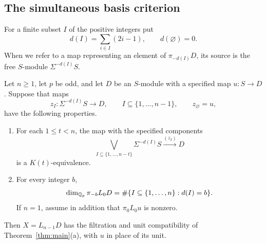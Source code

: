 \subsection{The simultaneous basis criterion}

For a finite subset \(I\) of the positive integers put
\[
d(I)=\sum_{i\in I}(2i-1),\qquad d(\varnothing)=0.
\]
When we refer to a map representing an element of
\(\pi_{-d(I)}D\), its source is the free \(S\)-module
\(\Sigma^{-d(I)}S\).

\begin{proposition}
\label{prop:assembly}
Let \(n\geq1\), let \(p\) be odd, and let \(D\) be an \(S\)-module with
a specified map \(u:S\to D\). Suppose that maps
\[
z_I:\Sigma^{-d(I)}S\longrightarrow D,
\qquad I\subseteq\{1,\ldots,n-1\},
\qquad z_\varnothing=u,
\]
have the following properties.
\begin{enumerate}[label=(\alph*)]
\item For each \(1\leq t<n\), the map with the specified components
\begin{equation}
\bigvee_{I\subseteq\{1,\ldots,n-t\}}\Sigma^{-d(I)}S
 \xrightarrow{(z_I)} D
\label{eq:criterion-bases}
\end{equation}
is a \(K(t)\)-equivalence.
\item For every integer \(b\),
\begin{equation}
\dim_{\mathbb Q_p}\pi_{-b}L_0D
=\#\{I\subseteq\{1,\ldots,n\}:d(I)=b\}.
\label{eq:criterion-rational}
\end{equation}
If \(n=1\), assume in addition that \(\pi_0L_0u\) is nonzero.
\end{enumerate}
Then \(X=L_{n-1}D\) has the filtration and unit compatibility of
Theorem~\ref{thm:main}(a), with \(u\) in place of its unit.
\end{proposition}

